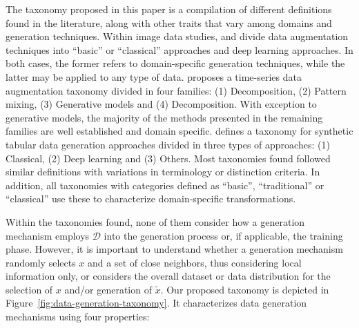 \documentclass[parskip=full]{scrartcl}
\begin{document}
The taxonomy proposed in this paper is a compilation of different definitions
found in the literature, along with other traits that vary among domains and
generation techniques. Within image data studies, \citet{shorten2019survey}
and \citet{khalifa2021comprehensive} divide data augmentation techniques into
``basic'' or ``classical'' approaches and deep learning approaches. In both
cases, the former refers to domain-specific generation techniques, while the
latter may be applied to any type of data. \citet{iwana2021empirical} proposes
a time-series data augmentation taxonomy divided in four families: (1)
Decomposition, (2) Pattern mixing, (3) Generative models and (4)
Decomposition. With exception to generative models, the majority of the
methods presented in the remaining families are well established and domain
specific. \citet{hernandez2022synthetic} defines a taxonomy for synthetic
tabular data generation approaches divided in three types of approaches: (1)
Classical, (2) Deep learning and (3) Others.  Most taxonomies found followed
similar definitions with variations in terminology or distinction criteria. In
addition, all taxonomies with categories defined as ``basic'', ``traditional''
or ``classical'' use these to characterize domain-specific transformations.

Within the taxonomies found, none of them consider how a generation
mechanism employs $\mathcal{D}$ into the generation process or, if
applicable, the training phase. However, it is important to understand whether
a generation mechanism randomly selects $x$ and a set of close neighbors, thus
considering local information only, or considers the overall dataset or data
distribution for the selection of $x$ and/or generation of $\tilde{x}$. Our
proposed taxonomy is depicted in Figure~\ref{fig:data-generation-taxonomy}. It
characterizes data generation mechanisms using four properties:
\end{document}
